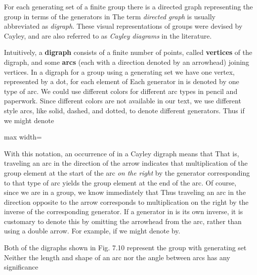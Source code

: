 \documentclass[11pt,oneside]{article}
\begin{document}
\begin{BookBody}
\noindent For each generating set  of a finite group  there is a directed graph representing the group in terms of the generators in  The term\textit{ directed graph} is usually abbreviated as \textit{digraph}. These visual representations of groups were devised by Cayley, and are also referred to as\textit{ Cayley diagrams} in the literature.

Intuitively, a\textbf{ digraph} consists of a finite number of points, called\textbf{ vertices} of the digraph, and some\textbf{ arcs} (each with a direction denoted by an arrowhead) joining vertices. In a digraph for a group  using a generating set  we have one vertex, represented by a dot, for each element of  Each generator in  is denoted by one type of arc. We could use different colors for different arc types in pencil and paperwork. Since different colors are not available in our text, we use different style arcs, like solid, dashed, and dotted, to denote different generators. Thus if  we might denote

\begin{center}\begin{adjustbox}{max width=\linewidth}\end{adjustbox}\end{center}

\noindent With this notation, an occurrence of  in a Cayley digraph means that  That is, traveling an arc in the direction of the arrow indicates that multiplication of the group element at the start of the arc\textit{ on the right} by the generator corresponding to that type of arc yields the group element at the end of the arc. Of course, since we are in a group, we know immediately that  Thus traveling an arc in the direction opposite to the arrow corresponds to multiplication on the right by the inverse of the corresponding generator. If a generator in  is its own inverse, it is customary to denote this by omitting the arrowhead from the arc, rather than using a double arrow. For example, if  we might denote  by.

 Both of the digraphs shown in Fig. 7.10 represent the group  with generating set  Neither the length and shape of an arc nor the angle between arcs has any significance\BookEnd{\blacktriangle}


\end{BookBody}
\end{document}
